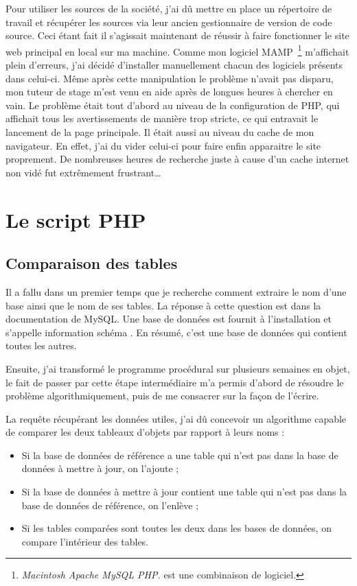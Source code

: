 Pour utiliser les sources de la société, j'ai dû mettre en place un répertoire
de travail et récupérer les sources via leur ancien gestionnaire de version de
code source. Ceci étant fait il s'agissait maintenant de réussir à faire
fonctionner le site web principal en local sur ma machine. Comme mon logiciel
MAMP\, \footnote{\emph{Macintosh Apache MySQL PHP.} est une combinaison de
logiciel.} m'affichait plein d'erreurs, j'ai décidé d'installer manuellement
chacun des logiciels présents dans celui-ci. Même après cette manipulation le
problème n'avait pas disparu, mon tuteur de stage m'est venu en aide après de
longues heures à chercher en vain. Le problème était tout d'abord au niveau de
la configuration de PHP, qui affichait tous les avertissements de manière trop
stricte, ce qui entravait le lancement de la page principale. Il était aussi au
niveau du cache de mon navigateur. En effet, j'ai du vider celui-ci pour faire
enfin apparaitre le site proprement. De nombreuses heures de recherche juste à
cause d'un cache internet non vidé fut extrêmement frustrant\dots

\section{Le script PHP} %
\label{sec:Le script PHP}

\subsection{Comparaison des tables} %
\label{sub:Comparaison des tables}

Il a fallu dans un premier temps que je recherche comment extraire le nom d'une
base ainsi que le nom de ses tables. La réponse à cette question est dans la
documentation de MySQL. Une base de données est fournit à l'installation et
s'appelle \og information schéma \fg{} . En résumé, c'est une base de données
qui contient toutes les autres.

Ensuite, j'ai transformé le programme procédural sur plusieurs semaines en
objet, le fait de passer par cette étape intermédiaire m'a permis d'abord de
résoudre le problème algorithmiquement, puis de me consacrer sur la façon de
l'écrire.

La requête récupérant les données utiles, j'ai dû concevoir un algorithme
capable de comparer les deux tableaux d'objets par rapport à leurs noms :
\begin{itemize}
    \item Si la base de données de référence a une table qui n'est pas dans
    la base de données à mettre à jour, on l'ajoute ;
    \item Si la base de données à mettre à jour contient une table qui n'est
    pas dans la base de données de référence, on l'enlève ;
    \item Si les tables comparées sont toutes les deux dans les bases de
    données, on compare l'intérieur des tables.
\end{itemize}

